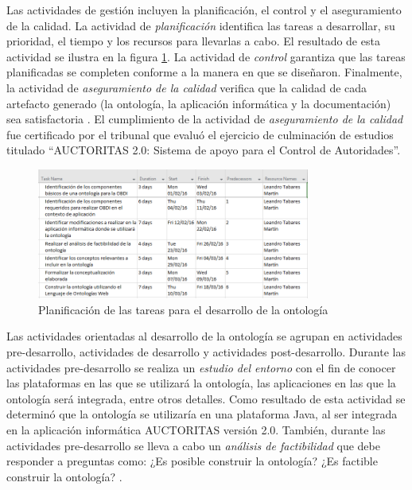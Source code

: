 Las actividades de gestión incluyen la planificación, el control y el aseguramiento de la calidad. La actividad de \textit{planificación} identifica las tareas a desarrollar, su prioridad, el tiempo y los recursos para llevarlas a cabo. El resultado de esta actividad se ilustra en la figura \ref{fig: planificacion}. La actividad de \textit{control} garantiza que las tareas planificadas se completen conforme a la manera en que se diseñaron. Finalmente, la actividad de \textit{aseguramiento de la calidad} verifica que la calidad de cada artefacto generado (la ontología, la aplicación informática y la documentación) sea satisfactoria \citep{Gomez-Perez:2007:OEE:1199560}. El cumplimiento de la actividad de \textit{aseguramiento de la calidad} fue certificado por el tribunal que evaluó el ejercicio de culminación de estudios titulado ``AUCTORITAS 2.0: Sistema de apoyo para el Control de Autoridades''.

\begin{figure}
\begin{center}
	\includegraphics[width=0.8\textwidth]{img/planificacionTareas.PNG}
\end{center}
\caption{Planificación de las tareas para el desarrollo de la ontología}
\label{fig: planificacion}
\end{figure}

Las actividades orientadas al desarrollo de la ontología se agrupan en actividades pre-desarrollo, actividades de desarrollo y actividades post-desarrollo. Durante las actividades pre-desarrollo se realiza un \textit{estudio del entorno} con el fin de conocer las plataformas en las que se utilizará la ontología, las aplicaciones en las que la ontología será integrada, entre otros detalles. Como resultado de esta actividad se determinó que la ontología se utilizaría en una plataforma Java, al ser integrada en la aplicación informática AUCTORITAS versión 2.0. También, durante las actividades pre-desarrollo se lleva a cabo un \textit{análisis de factibilidad} que debe responder a preguntas como: ¿Es posible construir la ontología? ¿Es factible construir la ontología? \citep{Gomez-Perez:2007:OEE:1199560}.

